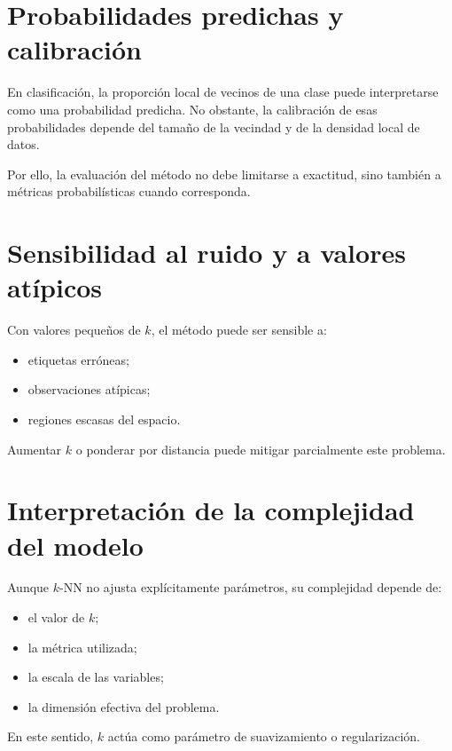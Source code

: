 \documentclass[
  spanish,
  11pt,
  letterpaper,
  DIV=11,
  numbers=noendperiod]{scrreprt}
\providecommand{\tightlist}{%
  \setlength{\itemsep}{0pt}\setlength{\parskip}{0pt}}
\theoremstyle{definition}
\theoremstyle{plain}
\theoremstyle{definition}
\theoremstyle{remark}
\begin{document}
\section{Probabilidades predichas y
calibración}\label{probabilidades-predichas-y-calibraciuxf3n}

En clasificación, la proporción local de vecinos de una clase puede
interpretarse como una probabilidad predicha. No obstante, la
calibración de esas probabilidades depende del tamaño de la vecindad y
de la densidad local de datos.

Por ello, la evaluación del método no debe limitarse a exactitud, sino
también a métricas probabilísticas cuando corresponda.

\section{Sensibilidad al ruido y a valores
atípicos}\label{sensibilidad-al-ruido-y-a-valores-atuxedpicos}

Con valores pequeños de \(k\), el método puede ser sensible a:

\begin{itemize}
\tightlist
\item
  etiquetas erróneas;
\item
  observaciones atípicas;
\item
  regiones escasas del espacio.
\end{itemize}

Aumentar \(k\) o ponderar por distancia puede mitigar parcialmente este
problema.

\section{Interpretación de la complejidad del
modelo}\label{interpretaciuxf3n-de-la-complejidad-del-modelo}

Aunque \(k\)-NN no ajusta explícitamente parámetros, su complejidad
depende de:

\begin{itemize}
\tightlist
\item
  el valor de \(k\);
\item
  la métrica utilizada;
\item
  la escala de las variables;
\item
  la dimensión efectiva del problema.
\end{itemize}

En este sentido, \(k\) actúa como parámetro de suavizamiento o
regularización.
\end{document}
